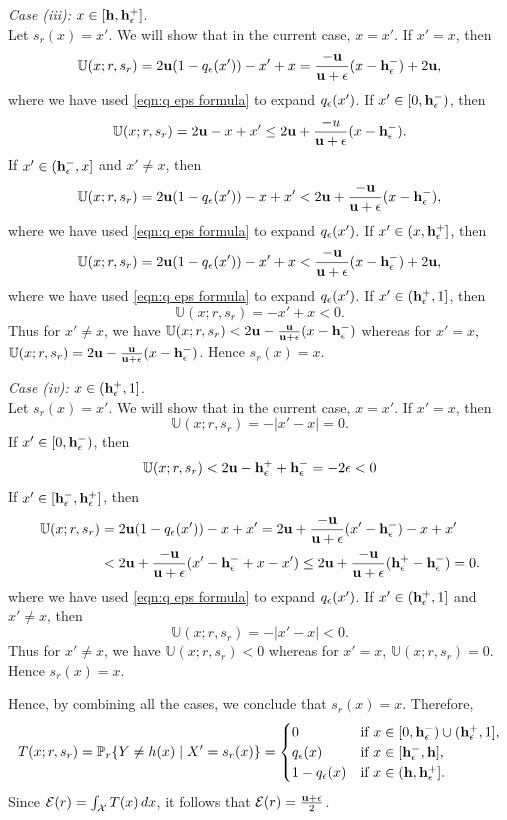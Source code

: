 \noindent \textit{Case (iii):} $ x \in [\mathbf{h}, \mathbf{h}_{\epsilon}^+] $.\\
   Let $s_r(x) = x'$. We will show that in the current case, $x=x'$. If $x'=x$, then 
\[\mathbb{U}(x;r,s_r) = 2\mathbf{u}(1-q_{\epsilon}(x')) - x' + x = \frac{-\mathbf{u}}{\mathbf{u}+\epsilon}(x-\mathbf{h}_{\epsilon}^-) + 2\mathbf{u},\] where we have used \eqref{eqn:q eps formula} to expand $q_{\epsilon}(x')$.    
If $x' \in [0,\mathbf{h}_{\epsilon}^-)$, then 
\[\mathbb{U}(x;r,s_r) = 2\mathbf{u} - x + x' \leq 2\mathbf{u} + \frac{-u}{\mathbf{u} + \epsilon}(x-\mathbf{h}_{\epsilon}^-).\]
If $x' \in (\mathbf{h}_{\epsilon}^-,x]$ and $x' \neq x$, then
\[\mathbb{U}(x;r,s_r) = 2\mathbf{u}(1-q_{\epsilon}(x')) - x + x' < 2\mathbf{u} + \frac{-\mathbf{u}}{\mathbf{u}+\epsilon}(x-\mathbf{h}_{\epsilon}^-),\] where we have used \eqref{eqn:q eps formula} to expand $q_{\epsilon}(x')$.    
If $x' \in (x,\mathbf{h}_{\epsilon}^+]$, then
\[\mathbb{U}(x;r,s_r) = 2\mathbf{u}(1- q_{\epsilon}(x')) - x' + x < \frac{-\mathbf{u}}{\mathbf{u}+\epsilon}(x-\mathbf{h}_{\epsilon}^-) + 2\mathbf{u},\] where we have used \eqref{eqn:q eps formula} to expand $q_{\epsilon}(x')$. If $x' \in (\mathbf{h}_{\epsilon}^+,1]$, then 
\[\mathbb{U}(x;r,s_r) = -x' + x < 0.\] 
Thus for $x' \neq x$, we have $\mathbb{U}(x;r,s_r) < 2\mathbf{u} - \frac{\mathbf{u}}{\mathbf{u}+\epsilon}(x-\mathbf{h}_{\epsilon}^-)$ whereas for $x' = x$, $\mathbb{U}(x;r,s_r) = 2\mathbf{u} - \frac{\mathbf{u}}{\mathbf{u}+\epsilon}(x-\mathbf{h}_{\epsilon}^-)$. Hence $s_r(x) = x$. 

\noindent \textit{Case (iv):} $ x \in (\mathbf{h}_{\epsilon}^+, 1] $.\\
      Let $s_r(x) = x'$. We will show that in the current case, $x=x'$. If $x'=x$, then 
\[\mathbb{U}(x;r,s_r) = -|x'-x| = 0.\]    
If $x' \in [0,\mathbf{h}_{\epsilon}^-)$, then 
\[\mathbb{U}(x;r,s_r) < 2\mathbf{u} - \mathbf{h}_{\epsilon}^+ +\mathbf{h}_{\epsilon}^- = -2\epsilon < 0\]
If $x' \in [\mathbf{h}_{\epsilon}^-,\mathbf{h}_{\epsilon}^+]$, then
\begin{equation*}
    \begin{aligned}
        \mathbb{U}(x;r,s_r) &= 2\mathbf{u}(1-q_{\epsilon}(x')) - x + x' = 2\mathbf{u} + \frac{-\mathbf{u}}{\mathbf{u}+\epsilon}(x' - \mathbf{h}_{\epsilon}^-) - x + x' \\
        &< 2\mathbf{u} + \frac{-\mathbf{u}}{\mathbf{u} +\epsilon}(x'-\mathbf{h}_{\epsilon}^- + x - x')  \leq 2\mathbf{u} + \frac{-\mathbf{u}}{\mathbf{u} + \epsilon}(\mathbf{h}_{\epsilon}^+-\mathbf{h}_{\epsilon}^-) =0.
    \end{aligned}
\end{equation*}
 where we have used \eqref{eqn:q eps formula} to expand $q_{\epsilon}(x')$.    
If $x' \in (\mathbf{h}_{\epsilon}^+,1]$ and $x' \neq x$, then 
\[\mathbb{U}(x;r,s_r) = -|x'-x| <  0.\] 
Thus for $x' \neq x$, we have $\mathbb{U}(x;r,s_r) < 0$ whereas for $x' = x$, $\mathbb{U}(x;r,s_r) = 0$.  Hence $s_r(x) = x$. 

Hence, by combining all the cases, we conclude that $ s_r(x) = x $. Therefore,
    \[
    T(x; r, s_r) = \mathbb{P}_{r}\{Y \neq h(x) \mid X' = s_r(x)\} = \begin{cases}
        0 & \text{if } x \in [0, \mathbf{h}_{\epsilon}^-) \cup (\mathbf{h}_{\epsilon}^+, 1], \\
        q_{\epsilon}(x) & \text{if } x \in [\mathbf{h}_{\epsilon}^-, \mathbf{h}], \\
        1 - q_{\epsilon}(x) & \text{if } x \in (\mathbf{h}, \mathbf{h}_{\epsilon}^+].
    \end{cases}
    \]
    Since $ \mathcal{E}(r) = \int_{\mathcal{X}} T(x) \, dx $, it follows that $ \mathcal{E}(r) = \frac{\mathbf{u} + \epsilon}{2} $.
